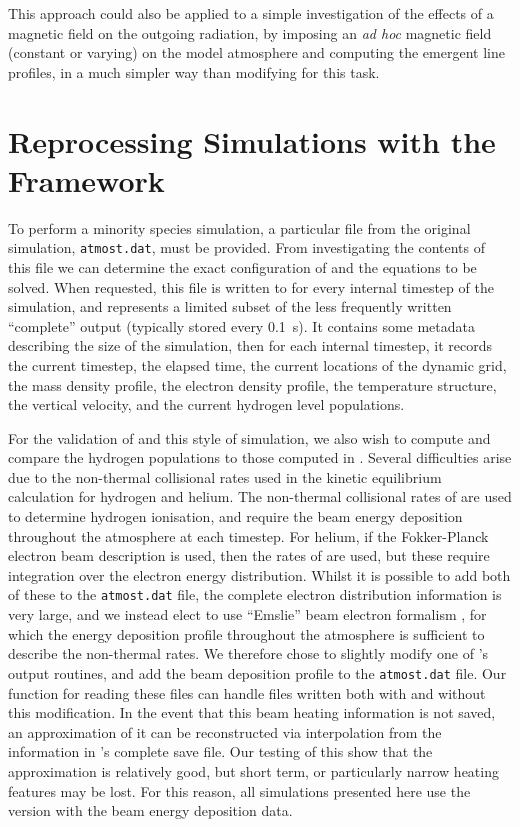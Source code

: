 This approach could also be applied to a simple investigation of the effects of a magnetic field on the outgoing radiation, by imposing an \emph{ad hoc} magnetic field (constant or varying) on the model atmosphere and computing the emergent line profiles, in a much simpler way than modifying \Radyn{} for this task.

\section{Reprocessing \Radyn{} Simulations with the \Lw{} Framework}

To perform a minority species simulation, a particular file from the original simulation, \texttt{atmost.dat}, must be provided.
From investigating the contents of this file we can determine the exact configuration of \Lw{} and the equations to be solved.
When requested, this file is written to for every internal timestep of the \Radyn{} simulation, and represents a limited subset of the less frequently written ``complete'' output (typically stored every \SI{0.1}{\second}).
It contains some metadata describing the size of the simulation, then for each internal timestep, it records the current timestep, the elapsed time, the current locations of the dynamic grid, the mass density profile, the electron density profile, the temperature structure, the vertical velocity, and the current hydrogen level populations.

For the validation of \Lw{} and this style of simulation, we also wish to compute and compare the hydrogen populations to those computed in \Radyn{}.
Several difficulties arise due to the non-thermal collisional rates used in the kinetic equilibrium calculation for hydrogen and helium.
The non-thermal collisional rates of \citet{1993Fang} are used to determine hydrogen ionisation, and require the beam energy deposition throughout the atmosphere at each timestep.
For helium, if the Fokker-Planck electron beam description is used, then the rates of \citet{Arnaud1985} are used, but these require integration over the electron energy distribution.
Whilst it is possible to add both of these to the \texttt{atmost.dat} file, the complete electron distribution information is very large, and we instead elect to use ``Emslie'' beam electron formalism \citep{Emslie1978}, for which the energy deposition profile throughout the atmosphere is sufficient to describe the non-thermal rates.
We therefore chose to slightly modify one of \Radyn{}'s output routines, and add the beam deposition profile to the \texttt{atmost.dat} file.
Our function for reading these files can handle files written both with and without this modification.
In the event that this beam heating information is not saved, an approximation of it can be reconstructed via interpolation from the information in \Radyn{}'s complete save file.
Our testing of this show that the approximation is relatively good, but short term, or particularly narrow heating features may be lost.
For this reason, all simulations presented here use the version with the beam energy deposition data.

